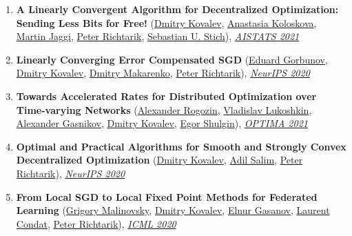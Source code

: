 \begin{enumerate}
\item \textbf{A Linearly Convergent Algorithm for Decentralized Optimization: Sending Less Bits for Free!} (\href{https://www.dmitry-kovalev.com}{\color{linkcolour}Dmitry Kovalev}, \href{https://scholar.google.com/citations?user=ldJpvE8AAAAJ}{\color{linkcolour}Anastasia Koloskova}, \href{https://people.epfl.ch/martin.jaggi}{\color{linkcolour}Martin Jaggi}, \href{https://richtarik.org}{\color{linkcolour}Peter Richtarik}, \href{https://sstich.ch}{\color{linkcolour}Sebastian U. Stich}), \href{http://proceedings.mlr.press/v130/kovalev21a}{\em \color{black}AISTATS 2021}
\item \textbf{Linearly Converging Error Compensated SGD} (\href{https://eduardgorbunov.github.io}{\color{linkcolour}Eduard Gorbunov}, \href{https://www.dmitry-kovalev.com}{\color{linkcolour}Dmitry Kovalev}, \href{}{\color{linkcolour}Dmitry Makarenko}, \href{https://richtarik.org}{\color{linkcolour}Peter Richtarik}), \href{https://papers.nips.cc/paper/2020/hash/ef9280fbc5317f17d480e4d4f61b3751-Abstract.html}{\em \color{black}NeurIPS 2020}
\item \textbf{Towards Accelerated Rates for Distributed Optimization over Time-varying Networks} (\href{https://scholar.google.com/citations?user=sEjyzkgAAAAJ}{\color{linkcolour}Alexander Rogozin}, \href{}{\color{linkcolour}Vladislav Lukoshkin}, \href{https://scholar.google.ru/citations?user=AmeE8qkAAAAJ}{\color{linkcolour}Alexander Gasnikov}, \href{https://www.dmitry-kovalev.com}{\color{linkcolour}Dmitry Kovalev}, \href{https://shulgin-egor.github.io}{\color{linkcolour}Egor Shulgin}), \href{https://link.springer.com/chapter/10.1007/978-3-030-91059-4_19}{\em \color{black}OPTIMA 2021}
\item \textbf{Optimal and Practical Algorithms for Smooth and Strongly Convex Decentralized Optimization} (\href{https://www.dmitry-kovalev.com}{\color{linkcolour}Dmitry Kovalev}, \href{https://adil-salim.github.io}{\color{linkcolour}Adil Salim}, \href{https://richtarik.org}{\color{linkcolour}Peter Richtarik}), \href{https://papers.nips.cc/paper/2020/hash/d530d454337fb09964237fecb4bea6ce-Abstract.html}{\em \color{black}NeurIPS 2020}
\item \textbf{From Local SGD to Local Fixed Point Methods for Federated Learning} (\href{https://scholar.google.com/citations?user=4w2W9KQAAAAJ}{\color{linkcolour}Grigory Malinovsky}, \href{https://www.dmitry-kovalev.com}{\color{linkcolour}Dmitry Kovalev}, \href{https://elnurgasanov.com}{\color{linkcolour}Elnur Gasanov}, \href{https://lcondat.github.io}{\color{linkcolour}Laurent Condat}, \href{https://richtarik.org}{\color{linkcolour}Peter Richtarik}), \href{http://proceedings.mlr.press/v119/malinovskiy20a.html}{\em \color{black}ICML 2020}

\end{enumerate}
